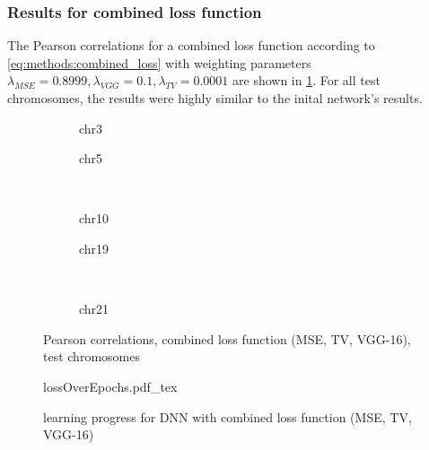 \subsubsection{Results for combined loss function} \label{sec:results:loss_functions}
The Pearson correlations for a combined loss function according to \cref{eq:methods:combined_loss} with weighting parameters $\lambda_\mathit{MSE} = 0.8999, \lambda_\mathit{VGG}=0.1, \lambda_\mathit{TV}=0.0001$ are shown in \cref{fig:results:combilossDNN_pearson}.
For all test chromosomes, the results were highly similar to the inital network's results.
\begin{figure}[p]
    \begin{subfigure}{0.45\textwidth}
        \scriptsize
        \caption{chr3}
    \end{subfigure} \hfill
    \begin{subfigure}{0.45\textwidth}
        \scriptsize
        \caption{chr5}
    \end{subfigure}\\[5mm]
    \begin{subfigure}{0.45\textwidth}
        \scriptsize
        \caption{chr10}
    \end{subfigure}\hfill
    \begin{subfigure}{0.45\textwidth}
        \scriptsize
        \caption{chr19}
    \end{subfigure}\\[3mm]
    \centering
    \begin{subfigure}{0.45\textwidth}
        \scriptsize
        \caption{chr21}
    \end{subfigure}
    \caption{Pearson correlations, combined loss function (MSE, TV, VGG-16),  test chromosomes}
    \label{fig:results:combilossDNN_pearson}
\end{figure}
\begin{figure}[hbp]
 \centering
 \scriptsize
 {lossOverEpochs.pdf_tex}
 \caption{learning progress for DNN with combined loss function (MSE, TV, VGG-16)} \label{fig:results:combilossDNN_lossEpochs}
\end{figure}

